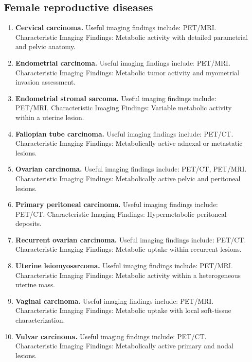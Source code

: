 \subsection{Female reproductive diseases}
\begin{enumerate}[leftmargin=*,itemsep=0.45em,topsep=0.4em]
\item \textbf{Cervical carcinoma.} Useful imaging findings include: PET/MRI. Characteristic Imaging Findings: Metabolic activity with detailed parametrial and pelvic anatomy.
\item \textbf{Endometrial carcinoma.} Useful imaging findings include: PET/MRI. Characteristic Imaging Findings: Metabolic tumor activity and myometrial invasion assessment.
\item \textbf{Endometrial stromal sarcoma.} Useful imaging findings include: PET/MRI. Characteristic Imaging Findings: Variable metabolic activity within a uterine lesion.
\item \textbf{Fallopian tube carcinoma.} Useful imaging findings include: PET/CT. Characteristic Imaging Findings: Metabolically active adnexal or metastatic lesions.
\item \textbf{Ovarian carcinoma.} Useful imaging findings include: PET/CT, PET/MRI. Characteristic Imaging Findings: Metabolically active pelvic and peritoneal lesions.
\item \textbf{Primary peritoneal carcinoma.} Useful imaging findings include: PET/CT. Characteristic Imaging Findings: Hypermetabolic peritoneal deposits.
\item \textbf{Recurrent ovarian carcinoma.} Useful imaging findings include: PET/CT. Characteristic Imaging Findings: Metabolic uptake within recurrent lesions.
\item \textbf{Uterine leiomyosarcoma.} Useful imaging findings include: PET/MRI. Characteristic Imaging Findings: Metabolic activity within a heterogeneous uterine mass.
\item \textbf{Vaginal carcinoma.} Useful imaging findings include: PET/MRI. Characteristic Imaging Findings: Metabolic uptake with local soft-tissue characterization.
\item \textbf{Vulvar carcinoma.} Useful imaging findings include: PET/CT. Characteristic Imaging Findings: Metabolically active primary and nodal lesions.
\end{enumerate}

